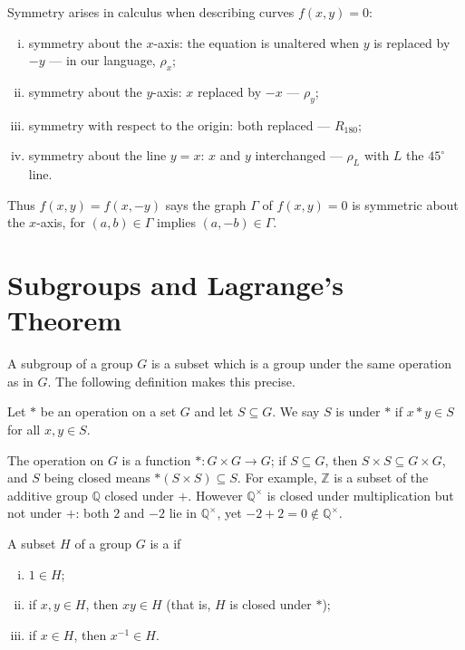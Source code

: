 \begin{note}
	Symmetry arises in calculus when describing curves \(f(x,y) = 0\):
	\begin{enumerate}[(i)]
		\item symmetry about the \(x\)-axis: the equation is unaltered when \(y\) is replaced
		      by \(-y\) --- in our language, \(\rho_x\);
		\item symmetry about the \(y\)-axis: \(x\) replaced by \(-x\) --- \(\rho_y\);
		\item symmetry with respect to the origin: both replaced --- \(R_{180}\);
		\item symmetry about the line \(y = x\): \(x\) and \(y\) interchanged ---
		      \(\rho_L\) with \(L\) the \(45^\circ\) line.
	\end{enumerate}
	Thus \(f(x,y) = f(x,-y)\) says the graph \(\Gamma\) of \(f(x,y) = 0\) is symmetric about
	the \(x\)-axis, for \((a,b) \in \Gamma\) implies \((a,-b) \in \Gamma\).
\end{note}

\section{Subgroups and Lagrange's Theorem}

A subgroup of a group \(G\) is a subset which is a group under the same operation as in
\(G\). The following definition makes this precise.

\begin{definition}
	Let \(*\) be an operation on a set \(G\) and let \(S \subseteq G\). We say \(S\) is
	 under \(*\) if \(x*y \in S\) for all \(x, y \in S\).
\end{definition}

The operation on \(G\) is a function \(*\colon G\times G \to G\); if \(S \subseteq G\),
then \(S \times S \subseteq G\times G\), and \(S\) being closed means
\(*(S\times S) \subseteq S\). For example, \(\mathbb{Z}\) is a subset of the additive group
\(\mathbb{Q}\) closed under \(+\). However \(\mathbb{Q}^\times\) is closed under
multiplication but not under \(+\): both \(2\) and \(-2\) lie in \(\mathbb{Q}^\times\), yet
\(-2 + 2 = 0 \notin \mathbb{Q}^\times\).

\begin{definition}[Subgroup]\label{def:subgroup}
	A subset \(H\) of a group \(G\) is a  if
	\begin{enumerate}[(i)]
		\item \(1 \in H\);
		\item if \(x, y \in H\), then \(xy \in H\) (that is, \(H\) is closed under \(*\));
		\item if \(x \in H\), then \(x^{-1} \in H\).
	\end{enumerate}
\end{definition}

